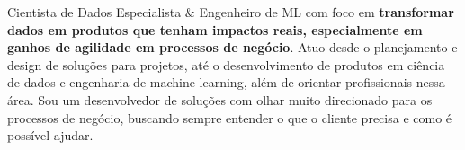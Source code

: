 

\begin{cvparagraph}

Cientista de Dados Especialista \& Engenheiro de ML com foco em \textbf{transformar dados em produtos que tenham impactos reais, especialmente em ganhos de agilidade em processos de negócio}. Atuo desde o planejamento e design de soluções para projetos, até o desenvolvimento de produtos em ciência de dados e engenharia de machine learning, além de orientar profissionais nessa área. Sou um desenvolvedor de soluções com olhar muito direcionado para os processos de negócio, buscando sempre entender o que o cliente precisa e como é possível ajudar.


\end{cvparagraph}
